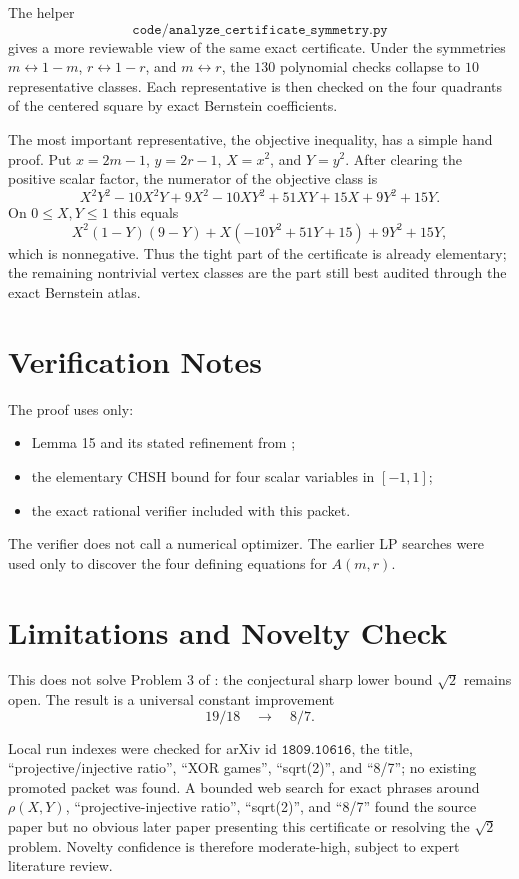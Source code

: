 \documentclass[11pt]{article}
\begin{document}
The helper
\[
\texttt{code/analyze\_certificate\_symmetry.py}
\]
gives a more reviewable view of the same exact certificate.  Under the
symmetries \(m\leftrightarrow1-m\), \(r\leftrightarrow1-r\), and
\(m\leftrightarrow r\), the \(130\) polynomial checks collapse to \(10\)
representative classes.  Each representative is then checked on the four
quadrants of the centered square by exact Bernstein coefficients.

The most important representative, the objective inequality, has a simple
hand proof.  Put \(x=2m-1\), \(y=2r-1\), \(X=x^2\), and \(Y=y^2\).  After
clearing the positive scalar factor, the numerator of the objective class is
\[
X^2Y^2-10X^2Y+9X^2-10XY^2+51XY+15X+9Y^2+15Y.
\]
On \(0\leq X,Y\leq1\) this equals
\[
X^2(1-Y)(9-Y)+X(-10Y^2+51Y+15)+9Y^2+15Y,
\]
which is nonnegative.  Thus the tight part of the certificate is already
elementary; the remaining nontrivial vertex classes are the part still best
audited through the exact Bernstein atlas.

\section*{Verification Notes}

The proof uses only:
\begin{itemize}
\item Lemma 15 and its stated refinement from \cite{ALPSW};
\item the elementary CHSH bound for four scalar variables in \([-1,1]\);
\item the exact rational verifier included with this packet.
\end{itemize}
The verifier does not call a numerical optimizer.  The earlier LP searches were
used only to discover the four defining equations for \(A(m,r)\).

\section*{Limitations and Novelty Check}

This does not solve Problem 3 of \cite{ALPSW}: the conjectural sharp lower
bound \(\sqrt2\) remains open.  The result is a universal constant improvement
\[
19/18\quad\longrightarrow\quad 8/7.
\]

Local run indexes were checked for arXiv id \(\texttt{1809.10616}\), the title,
``projective/injective ratio'', ``XOR games'', ``sqrt(2)'', and ``8/7''; no
existing promoted packet was found.  A bounded web search for exact phrases
around \(\rho(X,Y)\), ``projective-injective ratio'', ``sqrt(2)'', and ``8/7''
found the source paper but no obvious later paper presenting this certificate
or resolving the \(\sqrt2\) problem.  Novelty confidence is therefore
moderate-high, subject to expert literature review.
\end{document}
